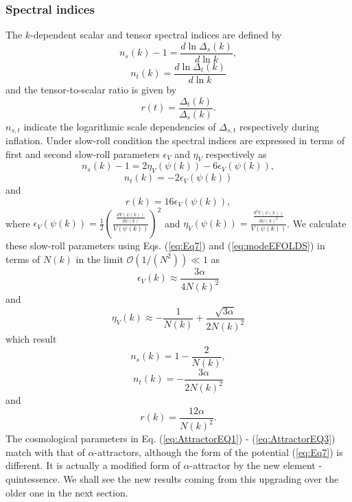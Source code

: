 \documentclass[a4paper,11pt]{article}
\begin{document}
\subsubsection{Spectral indices}
The $k$-dependent scalar and tensor spectral indices are defined by
\begin{equation}
    n_s(k) -1 =\frac{d\ln{\Delta_s(k)}}{d\ln{k}},
    \label{eq:LOGspectralIndex}
\end{equation}
\begin{equation}
    n_t(k) = \frac{d\ln{\Delta_t(k)}}{d\ln{k}}
    \label{eq:LogNT}
\end{equation} and the tensor-to-scalar ratio is given by
\begin{equation}
    r(t)=\frac{\Delta_t(k)}{\Delta_s(k)}.
    \label{eq:LogR}
\end{equation}
$n_{s,t}$ indicate the logarithmic scale dependencies of $\Delta_{s,t}$ respectively during inflation. Under slow-roll condition the spectral indices are expressed in terms of first and second slow-roll parameters $\epsilon_V$ and $\eta_V$ respectively as
\begin{equation}
    n_s(k) -1 = 2\eta_V(\psi(k))-6\epsilon_V(\psi(k)),
\end{equation}
\begin{equation}
    n_t(k) = -2\epsilon_V(\psi(k))
\end{equation} and 
\begin{equation}
    r(k)=16\epsilon_V(\psi(k)),
\end{equation}
where $\epsilon_V(\psi(k)) = \frac{1}{2}\left(\frac{\frac{dV(\psi(k))}{d\psi(k)}}{V(\psi(k))}\right)^2$ and $\eta_V(\psi(k))=\frac{\frac{d^2V(\psi(k))}{d\psi(k)^2}}{V(\psi(k))}$. We calculate these slow-roll parameters using Eqs. (\ref{eq:Eq7}) and (\ref{eq:modeEFOLDS}) in terms of $N(k)$ in the limit $\mathcal{O}(1/(N^2))\ll1$ as
\begin{equation}
    \epsilon_V(k)\approx \frac{3\alpha}{4N(k)^2}
\end{equation} and 
\begin{equation}
    \eta_V(k)\approx -\frac{1}{N(k)}+\frac{\sqrt{3\alpha}}{2N(k)^2}
\end{equation}
which result
\begin{equation}
    n_s(k) = 1-\frac{2}{N(k)},
    \label{eq:AttractorEQ1}
\end{equation}
\begin{equation}
    n_t(k) = -\frac{3\alpha}{2N(k)^2}
      \label{eq:AttractorEQ2}
\end{equation}
and
\begin{equation}
    r(k)=\frac{12\alpha}{N(k)^2}.
      \label{eq:AttractorEQ3}
\end{equation}
The cosmological parameters in Eq. (\ref{eq:AttractorEQ1}) - (\ref{eq:AttractorEQ3}) match with that of $\alpha$-attractors, although the form of the potential (\ref{eq:Eq7}) is different. It is actually a modified form of $\alpha$-attractor by the new element - quintessence. We shall see the new results coming from this upgrading over the older one in the next section.
\end{document}
